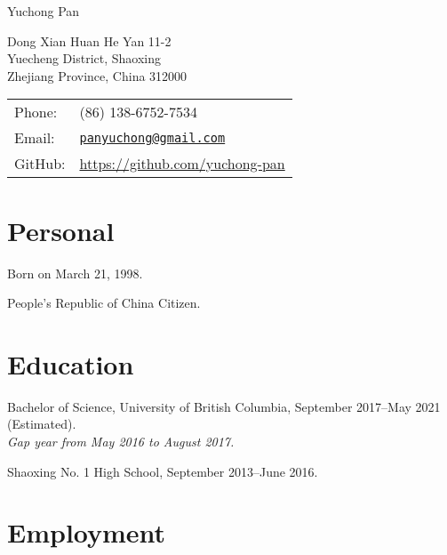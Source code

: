 \documentclass[letterpaper]{article}
\def\name{Yuchong Pan}
\renewenvironment{itemize}{
  \begin{list}{}{
    \setlength{\leftmargin}{1.5em}
  }
}{
  \end{list}
}
\begin{document}
{\huge \name}


\vspace{0.25in}

\begin{minipage}{0.45\linewidth}
  Dong Xian Huan He Yan 11-2 \\
  Yuecheng District, Shaoxing \\
  Zhejiang Province, China 312000
\end{minipage}
\begin{minipage}{0.45\linewidth}
  \begin{tabular}{ll}
    Phone: & (86) 138-6752-7534 \\
    Email: & \href{mailto:panyuchong@gmail.com}{\tt panyuchong@gmail.com} \\
    GitHub: & \url{https://github.com/yuchong-pan}
  \end{tabular}
\end{minipage}


\section*{Personal}

\begin{itemize}
    \item Born on March 21, 1998.

    \item People's Republic of China Citizen.
\end{itemize}


\section*{Education}

\begin{itemize}
  \item Bachelor of Science, University of British Columbia, September 2017--May 2021 (Estimated).\\
  \emph{Gap year from May 2016 to August 2017.}

  \item Shaoxing No. 1 High School, September 2013--June 2016.
\end{itemize}


\section*{Employment}
\end{document}
